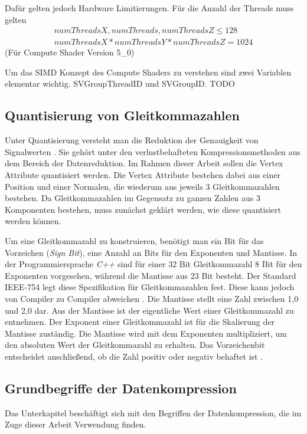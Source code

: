 Dafür gelten jedoch Hardware Limitierungen.
Für die Anzahl der Threads muss gelten
\begin{gather*}
	numThreadsX, numThreads, numThreadsZ \leq 128 \\
	numThreadsX * numThreadsY * numThreadsZ = 1024
\end{gather*}
(Für Compute Shader Version 5\_0)

Um das SIMD Konzept des Compute Shaders zu verstehen sind zwei Variablen elementar wichtig.
SVGroupThreadID und SVGroupID.
TODO

\subsection{Quantisierung von Gleitkommazahlen}
\label{subsec:quantisierung}
Unter Quantisierung versteht man die Reduktion der Genauigkeit von Signalwerten \cite{Strutz2009}.
Sie gehört unter den verlustbehafteten Kompressionsmethoden aus dem Bereich der Datenreduktion.
Im Rahmen dieser Arbeit sollen die Vertex Attribute quantisiert werden.
Die Vertex Attribute bestehen dabei aus einer Position und einer Normalen, die wiederum aus jeweils 3 Gleitkommazahlen bestehen.
Da Gleitkommazahlen im Gegensatz zu ganzen Zahlen aus 3 Komponenten bestehen, muss zunächst geklärt werden, wie diese quantisiert werden können. \newline

Um eine Gleitkommazahl zu konstruieren, benötigt man ein Bit für das Vorzeichen (\textit{Sign Bit}), eine Anzahl an Bits für den Exponenten und Mantisse.
In der Programmiersprache \textit{C++} sind für einer 32 Bit Gleitkommazahl 8 Bit für den Exponenten vorgesehen, während die Mantisse aus 23 Bit besteht.
Der Standard IEEE-754 legt diese Spezifikation für Gleitkommazahlen fest.
Diese kann jedoch von Compiler zu Compiler abweichen \cite{Microsoft2023}.
Die Mantisse stellt eine Zahl zwischen 1,0 und 2,0 dar.
Aus der Mantisse ist der eigentliche Wert einer Gleitkommazahl zu entnehmen.
Der Exponent einer Gleitkommazahl ist für die Skalierung der Mantisse zuständig.
Die Mantisse wird mit dem Exponenten multipliziert, um den absoluten Wert der Gleitkommazahl zu erhalten.
Das Vorzeichenbit entscheidet anschließend, ob die Zahl positiv oder negativ behaftet ist \cite{Widrow_Kollár_2008}. \newline



\subsection{Grundbegriffe der Datenkompression}
\label{subsec:grundbegriffe_datenkompression}
Das Unterkapitel beschäftigt sich mit den Begriffen der Datenkompression, die im Zuge dieser Arbeit Verwendung finden.


